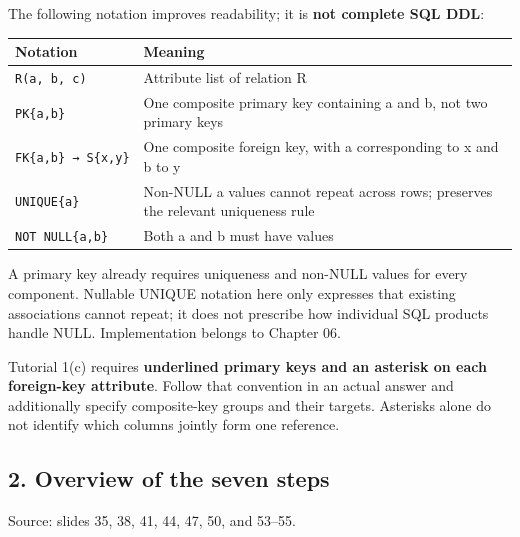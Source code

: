 The following notation improves readability; it is \textbf{not complete SQL DDL}:

\begin{longtable}[]{@{}
  >{\raggedright\arraybackslash}p{}
  >{\raggedright\arraybackslash}p{}@{}}
\toprule\noalign{}
\begin{minipage}[b]{\linewidth}\raggedright
Notation
\end{minipage} & \begin{minipage}[b]{\linewidth}\raggedright
Meaning
\end{minipage} \\
\midrule\noalign{}
\endhead
\bottomrule\noalign{}
\endlastfoot
\texttt{R(\allowbreak{}a,\allowbreak{}\ b,\allowbreak{}\ c)\allowbreak{}} & Attribute list of relation R \\
\texttt{PK\{a,b\}} & One composite primary key containing a and b, not two primary keys \\
\texttt{FK\{a,b\}\ →\ S\{x,y\}} & One composite foreign key, with a corresponding to x and b to y \\
\texttt{UNIQUE\{a\}} & Non-NULL a values cannot repeat across rows; preserves the relevant uniqueness rule \\
\texttt{NOT\ NULL\{a,b\}} & Both a and b must have values \\
\end{longtable}

A primary key already requires uniqueness and non-NULL values for every component. Nullable UNIQUE notation here only expresses that existing associations cannot repeat; it does not prescribe how individual SQL products handle NULL. Implementation belongs to Chapter 06.

Tutorial 1(c) requires \textbf{underlined primary keys and an asterisk on each foreign-key attribute}. Follow that convention in an actual answer and additionally specify composite-key groups and their targets. Asterisks alone do not identify which columns jointly form one reference.

\Needspace{11cm}
\subsection{2. Overview of the seven steps}\label{04_er_to_relational_mapping_en-overview-of-the-seven-steps}


Source: slides 35, 38, 41, 44, 47, 50, and 53--55.

